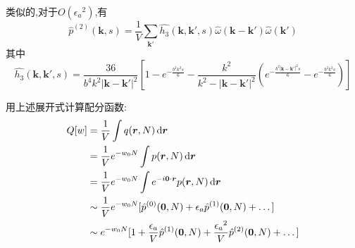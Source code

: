 类似的,对于$O({\epsilon_a}^2)$,有
\begin{equation}
{\hat{p}}^{(2)}(\mathbf{k},s) = \frac{1}{V} \sum_{\mathbf{k}'} \hat{h_3}(\mathbf{k},\mathbf{k}',s)\hat{\omega}(\mathbf{k}-\mathbf{k}')\hat{\omega}(\mathbf{k}')
\end{equation}
其中
\begin{equation}
\hat{h_3}(\mathbf{k},\mathbf{k}',s) = \frac{36}{b^4 k^2 {|\mathbf{k}-\mathbf{k}'|}^2} [1-e^{-\frac{b^2 k^2 s}{6}}-\frac{k^2}{k^2-{|\mathbf{k}-\mathbf{k}'|}^2}(e^{-\frac{b^2 {|\mathbf{k}-\mathbf{k}'|}^2 s}{6}}-e^{-\frac{b^2 k^2 s}{6}})]
\end{equation}

用上述展开式计算配分函数:
\begin{equation}
\begin{aligned}
   Q[w] &= \frac{1}{V} \int q(\bm{r} ,N)\,\mathrm{d}\bm{r} \\
&= \frac{1}{V} e^{-w_0 N} \int p(\bm{r} ,N)\,\mathrm{d} \bm{r} \\
&= \frac{1}{V} e^{-w_0 N} \int {e^{-i \mathbf{0} \cdot \bm{r}} p(\bm{r},N)}\,\mathrm{d} \bm{r} \\
&\sim \frac{1}{V} e^{-w_0 N} [\hat{p}^{(0)}(\mathbf{0},N)+\epsilon_a \hat{p}^{(1)}(\mathbf{0},N)+\dots]\\
&\sim e^{-w_0 N} [1+\frac{\epsilon_a}{V} \hat{p}^{(1)}(\mathbf{0},N)+\frac{{\epsilon_a}^2}{V} \hat{p}^{(2)}(\mathbf{0},N)+\dots]
\end{aligned}
\end{equation}

